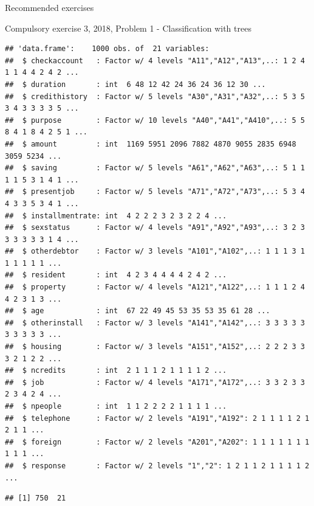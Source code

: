 \documentclass[10pt,ignorenonframetext,]{beamer}
\newenvironment{Shaded}{\begin{snugshade}}{\end{snugshade}}
\newcommand{\KeywordTok}[1]{\textcolor[rgb]{0.13,0.29,0.53}{\textbf{#1}}}
\newcommand{\DataTypeTok}[1]{\textcolor[rgb]{0.13,0.29,0.53}{#1}}
\newcommand{\DecValTok}[1]{\textcolor[rgb]{0.00,0.00,0.81}{#1}}
\newcommand{\FloatTok}[1]{\textcolor[rgb]{0.00,0.00,0.81}{#1}}
\newcommand{\StringTok}[1]{\textcolor[rgb]{0.31,0.60,0.02}{#1}}
\newcommand{\CommentTok}[1]{\textcolor[rgb]{0.56,0.35,0.01}{\textit{#1}}}
\newcommand{\OtherTok}[1]{\textcolor[rgb]{0.56,0.35,0.01}{#1}}
\newcommand{\OperatorTok}[1]{\textcolor[rgb]{0.81,0.36,0.00}{\textbf{#1}}}
\newcommand{\NormalTok}[1]{#1}
\begin{document}
\begin{frame}[fragile]{Recommended exercises}
\begin{block}{Compulsory exercise 3, 2018, Problem 1 - Classification
with trees}
\begin{verbatim}
## 'data.frame':    1000 obs. of  21 variables:
##  $ checkaccount   : Factor w/ 4 levels "A11","A12","A13",..: 1 2 4 1 1 4 4 2 4 2 ...
##  $ duration       : int  6 48 12 42 24 36 24 36 12 30 ...
##  $ credithistory  : Factor w/ 5 levels "A30","A31","A32",..: 5 3 5 3 4 3 3 3 3 5 ...
##  $ purpose        : Factor w/ 10 levels "A40","A41","A410",..: 5 5 8 4 1 8 4 2 5 1 ...
##  $ amount         : int  1169 5951 2096 7882 4870 9055 2835 6948 3059 5234 ...
##  $ saving         : Factor w/ 5 levels "A61","A62","A63",..: 5 1 1 1 1 5 3 1 4 1 ...
##  $ presentjob     : Factor w/ 5 levels "A71","A72","A73",..: 5 3 4 4 3 3 5 3 4 1 ...
##  $ installmentrate: int  4 2 2 2 3 2 3 2 2 4 ...
##  $ sexstatus      : Factor w/ 4 levels "A91","A92","A93",..: 3 2 3 3 3 3 3 3 1 4 ...
##  $ otherdebtor    : Factor w/ 3 levels "A101","A102",..: 1 1 1 3 1 1 1 1 1 1 ...
##  $ resident       : int  4 2 3 4 4 4 4 2 4 2 ...
##  $ property       : Factor w/ 4 levels "A121","A122",..: 1 1 1 2 4 4 2 3 1 3 ...
##  $ age            : int  67 22 49 45 53 35 53 35 61 28 ...
##  $ otherinstall   : Factor w/ 3 levels "A141","A142",..: 3 3 3 3 3 3 3 3 3 3 ...
##  $ housing        : Factor w/ 3 levels "A151","A152",..: 2 2 2 3 3 3 2 1 2 2 ...
##  $ ncredits       : int  2 1 1 1 2 1 1 1 1 2 ...
##  $ job            : Factor w/ 4 levels "A171","A172",..: 3 3 2 3 3 2 3 4 2 4 ...
##  $ npeople        : int  1 1 2 2 2 2 1 1 1 1 ...
##  $ telephone      : Factor w/ 2 levels "A191","A192": 2 1 1 1 1 2 1 2 1 1 ...
##  $ foreign        : Factor w/ 2 levels "A201","A202": 1 1 1 1 1 1 1 1 1 1 ...
##  $ response       : Factor w/ 2 levels "1","2": 1 2 1 1 2 1 1 1 1 2 ...
\end{verbatim}

\begin{Shaded}
\end{Shaded}

\begin{verbatim}
## [1] 750  21
\end{verbatim}


\end{block}
\end{frame}
\end{document}
